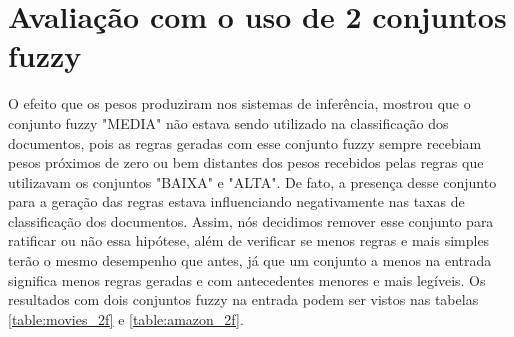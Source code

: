 \documentclass[template.tex]{subfiles}
\begin{document}
\section{Avaliação com o uso de 2 conjuntos fuzzy}
O efeito que os pesos produziram nos sistemas de inferência, mostrou que o conjunto fuzzy "MEDIA" não estava sendo utilizado na classificação dos documentos, pois as regras geradas com esse conjunto fuzzy sempre recebiam pesos próximos de zero ou bem distantes dos pesos recebidos pelas regras que utilizavam os conjuntos "BAIXA" e "ALTA". De fato, a presença desse conjunto para a geração das regras estava influenciando negativamente nas taxas de classificação dos documentos. Assim, nós decidimos remover esse conjunto para ratificar ou não essa hipótese, além de verificar se menos regras e mais simples terão o mesmo desempenho que antes, já que um conjunto a menos na entrada significa menos regras geradas e com antecedentes menores e mais legíveis. Os resultados com dois conjuntos fuzzy na entrada podem ser vistos nas tabelas \ref{table:movies_2f} e \ref{table:amazon_2f}.
\end{document}
